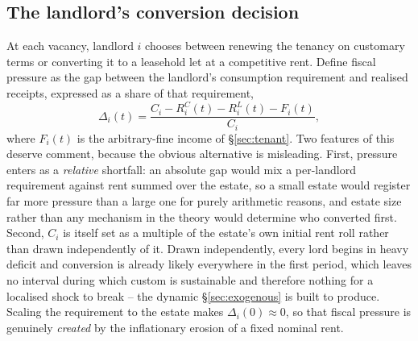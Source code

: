 \documentclass[11pt,english]{article}
\begin{document}
\subsection{The landlord's conversion decision}
\label{sec:decision}

At each vacancy, landlord $i$ chooses between renewing the tenancy on customary terms or converting it to a leasehold let at a competitive rent. Define fiscal pressure as the gap between the landlord's consumption requirement and realised receipts, expressed as a share of that requirement,
\begin{equation}
\Delta_i(t) = \frac{C_i - R_i^{C}(t) - R_i^{L}(t) - F_i(t)}{C_i},
\end{equation}
where $F_i(t)$ is the arbitrary-fine income of \S\ref{sec:tenant}. Two features of this deserve comment, because the obvious alternative is misleading. First, pressure enters as a \emph{relative} shortfall: an absolute gap would mix a per-landlord requirement against rent summed over the estate, so a small estate would register far more pressure than a large one for purely arithmetic reasons, and estate size rather than any mechanism in the theory would determine who converted first. Second, $C_i$ is itself set as a multiple of the estate's own initial rent roll rather than drawn independently of it. Drawn independently, every lord begins in heavy deficit and conversion is already likely everywhere in the first period, which leaves no interval during which custom is sustainable and therefore nothing for a localised shock to break -- the dynamic \S\ref{sec:exogenous} is built to produce. Scaling the requirement to the estate makes $\Delta_i(0)\approx 0$, so that fiscal pressure is genuinely \emph{created} by the inflationary erosion of a fixed nominal rent.
\end{document}
